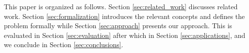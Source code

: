 

This paper is organized as follows.
Section \ref{sec:related_work} discusses related work. Section \ref{sec:formalization} introduces the relevant concepts and defines the problem formally while Section \ref{sec:approach} presents our approach. This is evaluated in Section \ref{sec:evaluation} after which  in Section \ref{sec:applications}, and we conclude in Section \ref{sec:conclusions}.



